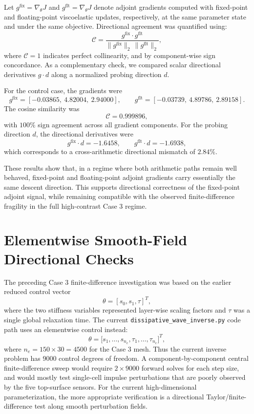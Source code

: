 \documentclass[11pt]{article}
\begin{document}
Let \(g^{\mathrm{fix}}=\nabla_\theta J\) and \(g^{\mathrm{flt}}=\nabla_\theta J\) denote adjoint gradients computed with fixed-point and floating-point viscoelastic updates, respectively, at the same parameter state and under the same objective.
Directional agreement was quantified using:
\[
\mathcal{C}=\frac{g^{\mathrm{fix}}\cdot g^{\mathrm{flt}}}
{\|g^{\mathrm{fix}}\|_2\,\|g^{\mathrm{flt}}\|_2},
\]
where \(\mathcal{C}=1\) indicates perfect collinearity, and by component-wise sign concordance.
As a complementary check, we compared scalar directional derivatives \(g\cdot d\) along a normalized probing direction \(d\).

For the control case, the gradients were
\[
g^{\mathrm{fix}}=[-0.03865,\ 4.82004,\ 2.94000],\qquad
g^{\mathrm{flt}}=[-0.03739,\ 4.89786,\ 2.89158].
\]
The cosine similarity was
\[
\mathcal{C}=0.999896,
\]
with \(100\%\) sign agreement across all gradient components.
For the probing direction \(d\), the directional derivatives were
\[
g^{\mathrm{fix}}\!\cdot d=-1.6458,\qquad
g^{\mathrm{flt}}\!\cdot d=-1.6938,
\]
which corresponds to a cross-arithmetic directional mismatch of \(2.84\%\).

These results show that, in a regime where both arithmetic paths remain well behaved, fixed-point and floating-point adjoint gradients carry essentially the same descent direction.
This supports directional correctness of the fixed-point adjoint signal, while remaining compatible with the observed finite-difference fragility in the full high-contrast Case 3 regime.

\section{Elementwise Smooth-Field Directional Checks}
The preceding Case 3 finite-difference investigation was based on the earlier reduced control vector
\[
\theta=[s_0,s_1,\tau]^T,
\]
where the two stiffness variables represented layer-wise scaling factors and \(\tau\) was a single global relaxation time.
The current \texttt{dissipative\_wave\_inverse.py} code path uses an elementwise control instead:
\[
\theta=\big[s_1,\ldots,s_{n_e},\tau_1,\ldots,\tau_{n_e}\big]^T,
\]
where \(n_e=150\times30=4500\) for the Case 3 mesh.
Thus the current inverse problem has 9000 control degrees of freedom.
A component-by-component central finite-difference sweep would require \(2\times9000\) forward solves for each step size, and would mostly test single-cell impulse perturbations that are poorly observed by the five top-surface sensors.
For the current high-dimensional parameterization, the more appropriate verification is a directional Taylor/finite-difference test along smooth perturbation fields.
\end{document}
